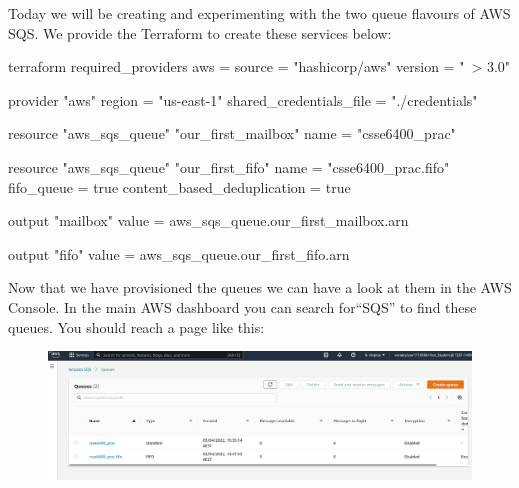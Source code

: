 \documentclass{csse4400}
\begin{document}
Today we will be creating and experimenting with the two queue flavours of AWS SQS.
We provide the Terraform to create these services below:



\begin{code}[language=terraform, numbers=none]{}
  terraform {
    required_providers {
      aws = {
        source = "hashicorp/aws"
        version = "~> 3.0"
      }
    }
  }
  
  provider "aws" {
    region = "us-east-1"
    shared_credentials_file = "./credentials"
  }
  
  resource "aws_sqs_queue" "our_first_mailbox" {
    name                        = "csse6400_prac"
  }
  
  resource "aws_sqs_queue" "our_first_fifo" {
    name                        = "csse6400_prac.fifo"
    fifo_queue                  = true
    content_based_deduplication = true
  }
  
  output "mailbox" {
      value = aws_sqs_queue.our_first_mailbox.arn
  }
  
  output "fifo" {
      value = aws_sqs_queue.our_first_fifo.arn
  }
\end{code}

Now that we have provisioned the queues we can have a look at them in the AWS Console.
In the main AWS dashboard you can search for``SQS'' to find these queues.
You should reach a page like this:

\begin{figure}[H]
  \includegraphics[width=\textwidth]{images/sqspanel}
\end{figure}
\end{document}
